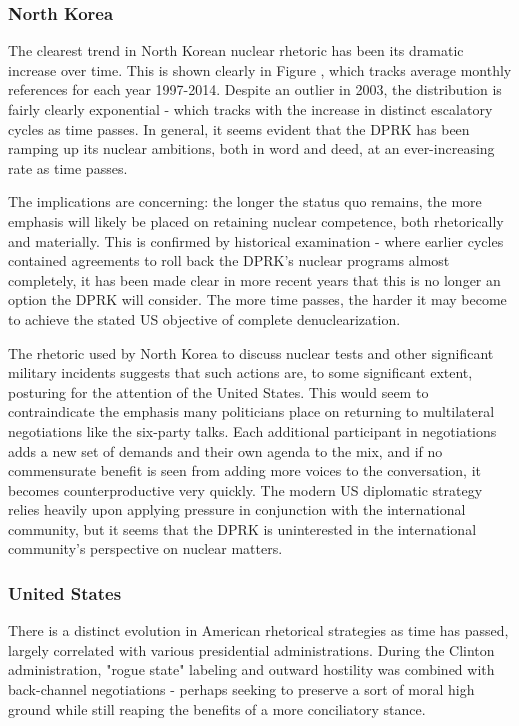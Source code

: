 \documentclass{article}
\begin{document}
\subsubsection{North Korea}

The clearest trend in North Korean nuclear rhetoric has been its dramatic increase over time. This is shown clearly in Figure , which tracks average monthly references for each year 1997-2014. Despite an outlier in 2003, the distribution is fairly clearly exponential - which tracks with the increase in distinct escalatory cycles as time passes. In general, it seems evident that the DPRK has been ramping up its nuclear ambitions, both in word and deed, at an ever-increasing rate as time passes.

The implications are concerning: the longer the status quo remains, the more emphasis will likely be placed on retaining nuclear competence, both rhetorically and materially. This is confirmed by historical examination - where earlier cycles contained agreements to roll back the DPRK's nuclear programs almost completely, it has been made clear in more recent years that this is no longer an option the DPRK will consider. The more time passes, the harder it may become to achieve the stated US objective of complete denuclearization.

The rhetoric used by North Korea to discuss nuclear tests and other significant military incidents suggests that such actions are, to some significant extent, posturing for the attention of the United States. This would seem to contraindicate the emphasis many politicians place on returning to multilateral negotiations like the six-party talks. Each additional participant in negotiations adds a new set of demands and their own agenda to the mix, and if no commensurate benefit is seen from adding more voices to the conversation, it becomes counterproductive very quickly. The modern US diplomatic strategy relies heavily upon applying pressure in conjunction with the international community, but it seems that the DPRK is uninterested in the international community's perspective on nuclear matters.

\subsubsection{United States}
There is a distinct evolution in American rhetorical strategies as time has passed, largely correlated with various presidential administrations. During the Clinton administration, "rogue state" labeling and outward hostility was combined with back-channel negotiations - perhaps seeking to preserve a sort of moral high ground while still reaping the benefits of a more conciliatory stance.
\end{document}
